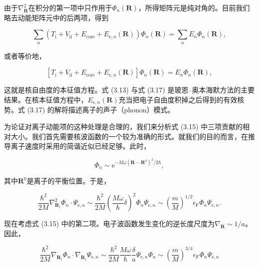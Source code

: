 由于$\nabla_{\mathbf R}^2$在积分的第一项中只作用于$\Phi_n(\mathbf R)$，所得矩阵元是纯对角的。目前我们略去动能矩阵元中的后两项，得到

\begin{equation*}
\sum_n \left(T_{\mathrm i} + V_{\mathrm{ii}} + E_{\mathrm{core}} + E_{\mathrm e,n}(\mathbf R)\right)\Phi_n(\mathbf R) = \sum_n E_n\Phi_n(\mathbf R),
\tag{3.16}
\end{equation*}

或者等价地，

\begin{equation*}
\left[T_{\mathrm i} + V_{\mathrm{ii}} + E_{\mathrm{core}} + E_{\mathrm e,n}(\mathbf R)\right]\Phi_n(\mathbf R) = E_n\Phi_n(\mathbf R),
\tag{3.17}
\end{equation*}

这就是核自由度的本征值方程。式 (3.13) 与式 (3.17) 是玻恩–奥本海默方法的主要结果。在核本征值方程中，$E_{\mathrm e,n}(\mathbf R)$充当把电子自由度积掉之后得到的有效核势。式 (3.17) 的解将描述离子的声子（phonon）模式。

为论证对离子动能项的这种处理是合理的，我们来分析式 (3.15) 中三项贡献的相对大小。我们首先需要核波函数的一个较为准确的形式。就我们的目的而言，在推导离子速度时采用的简谐近似已经足够。此时，

\begin{equation*}
\Phi_n \sim \mathrm e^{-M\omega(\mathbf R-\mathbf R^0)^2/2\hbar},
\tag{3.18}
\end{equation*}

其中$\mathbf R^0$是离子的平衡位置。于是，

\begin{equation*}
\frac{\hbar^2}{2M}\nabla_{\mathbf R_i}^2\Phi_n\cdot\Psi_{\mathrm e,n} \sim \frac{\hbar^2}{2M}\left(\frac{M\omega}{\hbar}\delta\right)^2 \Phi_n\Psi_{\mathrm e,n} \sim \left(\frac{m}{M}\right)^{1/2}\epsilon_{\mathrm F}\Phi_n\Psi_{\mathrm e,n}.
\tag{3.19}
\end{equation*}

现在考虑式 (3.15) 中的第二项。电子波函数发生变化的逆长度尺度为$\nabla_{\mathbf R}\sim 1/a$。因此，

\begin{equation*}
\frac{\hbar^2}{2M}\nabla_{\mathbf R_i}\Phi_n\cdot\nabla_{\mathbf R_i}\Psi_{\mathrm e,n} \sim \frac{\hbar^2}{2M}\frac{M\omega}{\hbar}\frac{\delta}{a}\Psi_{\mathrm e,n}\Phi_n \sim \left(\frac{m}{M}\right)^{3/4}\epsilon_{\mathrm F}\Phi_n\Psi_{\mathrm e,n}
\tag{3.20}
\end{equation*}

